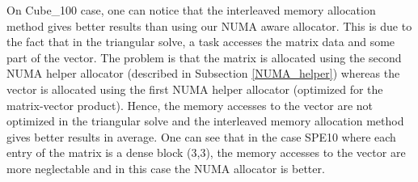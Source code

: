 On Cube\_100 case, one can notice that the interleaved memory allocation method
gives better results than using our NUMA aware allocator. This is due to the fact
that in the triangular solve, a task accesses the matrix data and some part of
the vector. The problem is that the matrix is allocated using the second NUMA helper
allocator (described in Subsection \ref{NUMA_helper}) whereas the vector is
allocated using the first NUMA helper allocator (optimized for the matrix-vector
product). Hence, the memory accesses to the vector are not optimized in the
triangular solve and the interleaved memory allocation method gives better results
in average. One can see that in the case SPE10 where each entry of the matrix
is a dense block (3,3), the memory accesses to the vector are more neglectable
and in this case the NUMA allocator is better.




